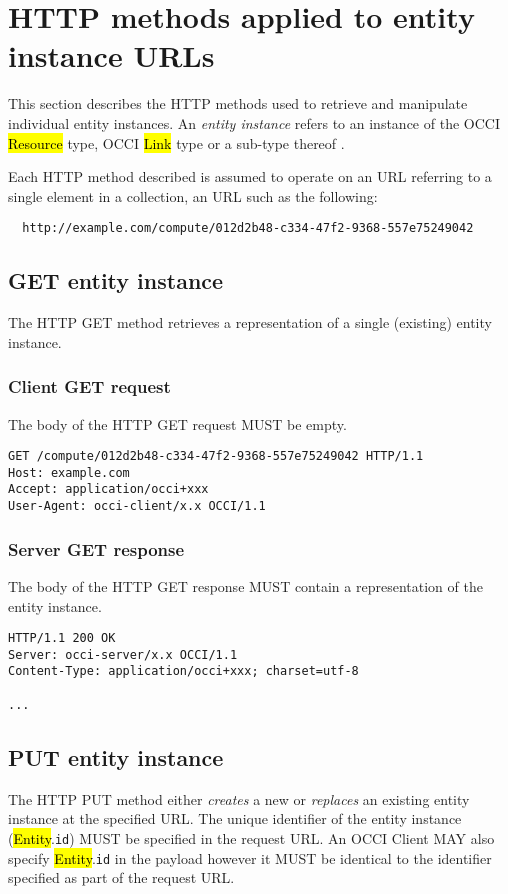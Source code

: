 \documentclass[10pt,a4paper]{article}
\begin{document}
\section{HTTP methods applied to entity instance URLs}


This section describes the HTTP methods used to retrieve and manipulate
individual entity instances. An {\em entity instance} refers to an instance
of the OCCI \hl{Resource} type, OCCI \hl{Link} type or a sub-type thereof
\cite{occi:core}.

Each HTTP method described is assumed to operate
on an URL referring to a single element in a collection, an URL such as the
following:
\begin{verbatim}
  http://example.com/compute/012d2b48-c334-47f2-9368-557e75249042
\end{verbatim}


\subsection{GET entity instance}
The HTTP GET method retrieves a representation of a single (existing)
entity instance.

\subsubsection{Client GET request}
The body of the HTTP GET request MUST be empty.
\begin{verbatim}
GET /compute/012d2b48-c334-47f2-9368-557e75249042 HTTP/1.1
Host: example.com
Accept: application/occi+xxx
User-Agent: occi-client/x.x OCCI/1.1
\end{verbatim}

\subsubsection{Server GET response}
The body of the HTTP GET response MUST contain a representation of the entity
instance.
\begin{verbatim}
HTTP/1.1 200 OK
Server: occi-server/x.x OCCI/1.1
Content-Type: application/occi+xxx; charset=utf-8

...
\end{verbatim}


\subsection{PUT entity instance}
The HTTP PUT method either {\em creates} a new or {\em replaces} an existing
entity instance at the specified URL.
%
The unique identifier of the entity instance (\hl{Entity}.{\tt id}) MUST be
specified in the request URL.
An OCCI Client MAY also specify \hl{Entity}.{\tt id} in the payload however it
MUST be identical to the identifier specified as part of the request URL.
\end{document}
